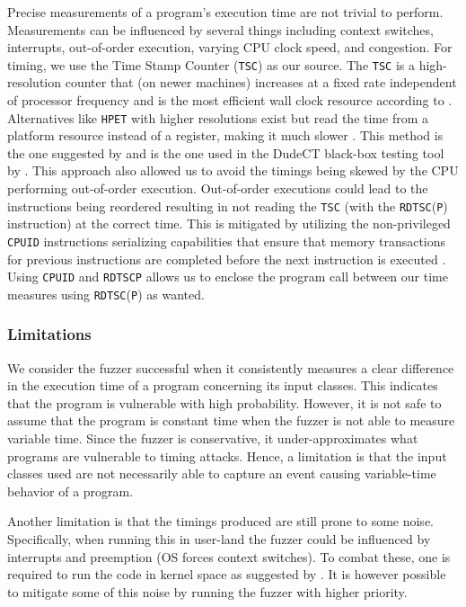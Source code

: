 Precise measurements of a program's execution time are not trivial to perform. 
Measurements can be influenced by several things including context switches, interrupts, out-of-order execution, varying CPU clock speed, and congestion. 
For timing, we use the Time Stamp Counter (\texttt{TSC}) as our source.
The \texttt{TSC} is a high-resolution counter that (on newer machines) increases at a fixed rate independent of processor frequency and is the most efficient wall clock resource according to \citep[b]{intel-reference}.
Alternatives like \texttt{HPET} with higher resolutions exist but read the time from a platform resource instead of a register, making it much slower \citep[b]{intel-reference}.
This method is the one suggested by \citep{intel-benchmark-code-execution} and is the one used in the DudeCT black-box testing tool by \citep{dudect}.
This approach also allowed us to avoid the timings being skewed by the CPU performing out-of-order execution.
Out-of-order executions could lead to the instructions being reordered resulting in not reading the \texttt{TSC} (with the \texttt{RDTSC}(\texttt{P}) instruction) at the correct time. 
This is mitigated by utilizing the non-privileged \texttt{CPUID} instructions serializing capabilities that ensure that memory transactions for previous instructions are completed before the next instruction is executed \citep[a]{intel-reference}.
Using \texttt{CPUID} and \texttt{RDTSCP} allows us to enclose the program call between our time measures using \texttt{RDTSC}(\texttt{P}) as wanted.

\subsubsection{Limitations}
We consider the fuzzer successful when it consistently measures a clear difference in the execution time of a program concerning its input classes.
This indicates that the program is vulnerable with high probability.
However, it is not safe to assume that the program is constant time when the fuzzer is not able to measure variable time.
Since the fuzzer is conservative, it under-approximates what programs are vulnerable to timing attacks.
Hence, a limitation is that the input classes used are not necessarily able to capture an event causing variable-time behavior of a program.

Another limitation is that the timings produced are still prone to some noise.
Specifically, when running this in user-land the fuzzer could be influenced by interrupts and preemption (OS forces context switches). 
To combat these, one is required to run the code in kernel space as suggested by \citep{intel-benchmark-code-execution}.
It is however possible to mitigate some of this noise by running the fuzzer with higher priority. 
